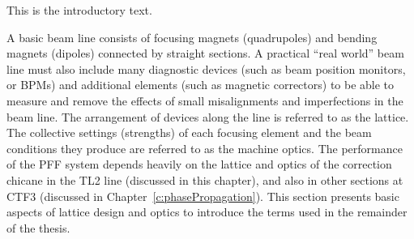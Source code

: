 
This is the introductory text.


A basic beam line consists of focusing magnets (quadrupoles) and bending magnets (dipoles) connected by straight sections. A practical ``real world'' beam line must also include many diagnostic devices (such as beam position monitors, or BPMs) and additional elements (such as magnetic correctors) to be able to measure and remove the effects of small misalignments and imperfections in the beam line. The arrangement of devices along the line is referred to as the lattice. The collective settings (strengths) of each focusing element and the beam conditions they produce are referred to as the machine optics. The performance of the PFF system depends heavily on the lattice and optics of the correction chicane in the TL2 line (discussed in this chapter), and also in other sections at CTF3 (discussed in Chapter~\ref{c:phasePropagation}). This section presents basic aspects of lattice design and optics to introduce the terms used in the remainder of the thesis.


